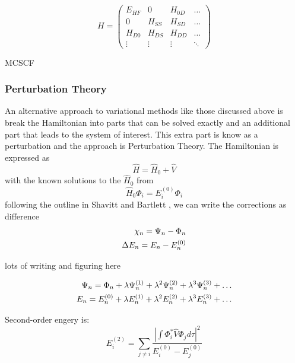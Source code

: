 \begin{equation}
H=\left(
\begin{array}{cccc}
	E_{HF} & 0 & H_{0D} & \ldots \\
	0 & H_{SS} & H_{SD} & \ldots \\
	H_{D0} & H_{DS} & H_{DD} & \ldots \\
	\vdots & \vdots & \vdots & \ddots 
	\end{array}
	\right)
\end{equation}

MCSCF

 
\subsubsection{Perturbation Theory}
An alternative approach to variational methods like those discussed above is break the Hamiltonian into parts that can be solved exactly and an additional part that leads to the system of interest.  This extra part is know as a perturbation and the approach is Perturbation Theory.  The Hamiltonian is expressed as 
\begin{equation}
\widehat{H} = \widehat{H}_0 + \widehat{V}
\end{equation}
with the known solutions to the $\widehat{H}_0$ from
\begin{equation}
\widehat{H}_0\Phi_i = E_i^{(0)}\Phi_i
\end{equation}  
following the outline in Shavitt and Bartlett \cite{ShavBart}, we can write the corrections as difference
\begin{align}
\chi_n = \Psi_n - \Phi_n \notag \\
\Delta E_n = E_n - E_n^{(0)}
\end{align}


lots of writing and figuring here

\begin{align}
\Psi_n = \Phi_n + \lambda\Psi_n^{(1)} + \lambda^2\Psi_n^{(2)} + \lambda^3\Psi_n^{(3)} + \ldots \notag \\
E_n = E_n^{(0)} + \lambda E_n^{(1)} + \lambda^2 E_n^{(2)} + \lambda^3 E_n^{(3)} + \ldots
\end{align}
  
  
Second-order engery is:
\begin{equation}
E_i^{(2)} = \sum_{j \neq i}\frac{\left|\int\Phi_i^*\widehat{V}\Phi_j d\tau\right|^2}{E_i^{(0)} - E_j^{(0)}}
\end{equation}
  
